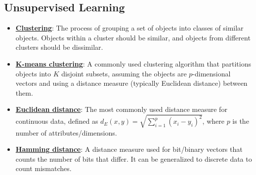 \documentclass{article}%
\begin{document}
%
\subsection{Unsupervised Learning}%
\label{subsec:UnsupervisedLearning}%
\begin{itemize}[leftmargin=*]%
\item \href{https://purdue.brightspace.com/d2l/common/assets/pdfjs-d2l-dist/1.0.14-legacy/web/viewer.html?file=\%2Fcontent\%2Fenforced\%2F1095467-wl.202510.CS.24300.001\%2F12L2-distance-clusters.pdf\%3Fou\%3D1095467\&lang=en-us\&container=d2l-fileviewer-rendered-pdf\&fullscreen=d2l-fileviewer-rendered-pdf-dialog\&height=667#page=4}{\textbf{Clustering}}: The process of grouping a set of objects into classes of similar objects. Objects within a cluster should be similar, and objects from different clusters should be dissimilar.%
\item \href{https://purdue.brightspace.com/d2l/common/assets/pdfjs-d2l-dist/1.0.14-legacy/web/viewer.html?file=\%2Fcontent\%2Fenforced\%2F1095467-wl.202510.CS.24300.001\%2F12L2-distance-clusters.pdf\%3Fou\%3D1095467\&lang=en-us\&container=d2l-fileviewer-rendered-pdf\&fullscreen=d2l-fileviewer-rendered-pdf-dialog\&height=667#page=21}{\textbf{K-means clustering}}: A commonly used clustering algorithm that partitions objects into $K$ disjoint subsets, assuming the objects are $p$-dimensional vectors and using a distance measure (typically Euclidean distance) between them.%
\item \href{https://purdue.brightspace.com/d2l/common/assets/pdfjs-d2l-dist/1.0.14-legacy/web/viewer.html?file=\%2Fcontent\%2Fenforced\%2F1095467-wl.202510.CS.24300.001\%2F12L2-distance-clusters.pdf\%3Fou\%3D1095467\&lang=en-us\&container=d2l-fileviewer-rendered-pdf\&fullscreen=d2l-fileviewer-rendered-pdf-dialog\&height=667#page=17}{\textbf{Euclidean distance}}: The most commonly used distance measure for continuous data, defined as $d_E(x, y) = \sqrt{\sum_{i=1}^{p} (x_i - y_i)^2}$, where $p$ is the number of attributes/dimensions.%
\item \href{https://purdue.brightspace.com/d2l/common/assets/pdfjs-d2l-dist/1.0.14-legacy/web/viewer.html?file=\%2Fcontent\%2Fenforced\%2F1095467-wl.202510.CS.24300.001\%2F12L2-distance-clusters.pdf\%3Fou\%3D1095467\&lang=en-us\&container=d2l-fileviewer-rendered-pdf\&fullscreen=d2l-fileviewer-rendered-pdf-dialog\&height=667#page=19}{\textbf{Hamming distance}}: A distance measure used for bit/binary vectors that counts the number of bits that differ. It can be generalized to discrete data to count mismatches.%

\end{itemize}
\end{document}

